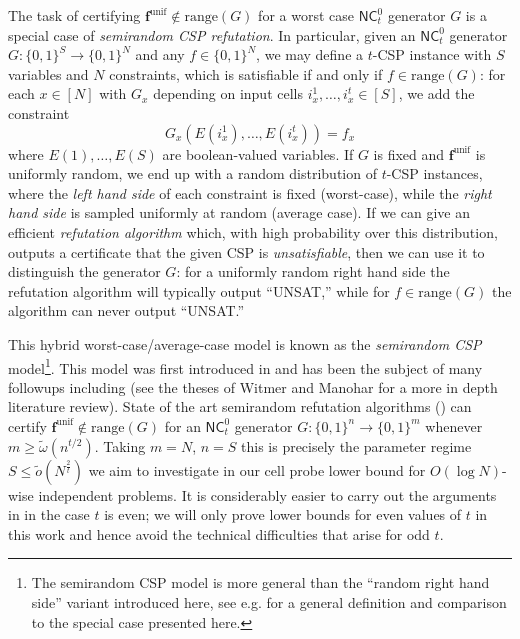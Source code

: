 \documentclass[11pt]{article}
\newcommand{\B}{\{0,1\}}
\newcommand{\rng}{\mathrm{range}}
\newcommand{\N}{[N]}
\begin{document}
The task of certifying $\bm{f}^{\mathrm{unif}} \notin \rng(G)$ for a worst case $\mathsf{NC}^0_t$ generator $G$ is a special case of \emph{semirandom CSP refutation}. In particular, given an $\mathsf{NC}^0_t$ generator $G:  \B^S \to \B^N$ and any $f \in \B^N$, we may define a $t$-CSP instance with $S$ variables and $N$ constraints, which is satisfiable if and only if $f \in \rng(G)$: for each $x \in \N$ with $G_x$ depending on input cells $i_x^1,\ldots,i_x^t\in [S]$, we add the constraint 
\[
G_x(E(i_x^1),\ldots,E(i_x^t)) = f_x
\]
where $E(1),\ldots,E(S)$ are boolean-valued variables. If $G$ is fixed and $\bm{f}^{\mathrm{unif}}$ is uniformly random, we end up with a random distribution of $t$-CSP instances, where the \emph{left hand side} of each constraint is fixed (worst-case), while the \emph{right hand side} is sampled uniformly at random (average case). If we can give an efficient \emph{refutation algorithm} which, with high probability over this distribution, outputs a certificate that the given CSP is \emph{unsatisfiable}, then we can use it to distinguish the generator $G$: for a uniformly random right hand side the refutation algorithm will typically output ``UNSAT,'' while for $f \in \rng(G)$ the algorithm can never output ``UNSAT.''

This hybrid worst-case/average-case model is known as the \emph{semirandom CSP} model\footnote{The semirandom CSP model is more general than the ``random right hand side'' variant introduced here, see e.g. \cite{semirandom} for a general definition and comparison to the special case presented here.}. This model was first introduced in \cite{feige-semirandom} and has been the subject of many followups including \cite{feige-semirandom,aow,semirandom,smoothed} (see the theses of Witmer and Manohar \cite{witmer-thesis,manohar-thesis} for a more in depth literature review).
State of the art semirandom refutation algorithms (\cite{semirandom,smoothed,simpler-moore}) can certify $\bm{f}^{\mathrm{unif}} \notin \rng(G)$ for an $\mathsf{NC}^0_t$ generator $G: \B^n \to \B^m$ whenever $m \geq \tilde{\omega}(n^{t/2})$. Taking $m = N$, $n = S$ this is precisely the parameter regime $S \leq \tilde{o}(N^{\frac{2}{t}})$ we aim to investigate in our cell probe lower bound for $O(\log N)$-wise independent problems. 
It is considerably easier to carry out the arguments in \cite{semirandom,smoothed,simpler-moore} in the case $t$ is even; we will only prove lower bounds for even values of $t$ in this work and hence avoid the technical difficulties that arise for odd $t$. 
\end{document}
